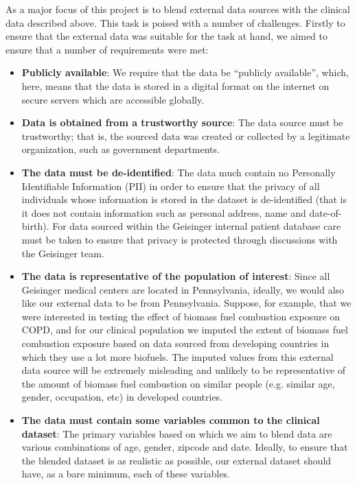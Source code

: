 \documentclass{article}
\begin{document}
As a major focus of this project is to blend external data sources with the clinical data described above. This task is poised with a number of challenges. Firstly to ensure that the external data was suitable for the task at hand, we aimed to ensure that a number of requirements were met:
\begin{itemize}
\item {\bf Publicly available}: We require that the data be ``publicly available'', which, here, means that the data is stored in a digital format on the internet on secure servers which are accessible globally. 
\item {\bf Data is obtained from a trustworthy source}: The data source must be trustworthy; that is, the sourced data was created or collected by a legitimate organization, such as government departments. 
\item {\bf The data must be de-identified}: The data much contain no Personally Identifiable Information (PII) in order to ensure that the privacy of all individuals whose information is stored in the dataset is de-identified (that is it does not contain information such as personal address, name and date-of-birth). For data sourced within the Geisinger internal patient database care must be taken to ensure that privacy is protected through discussions with the Geisinger team. 
\item {\bf The data is representative of the population of interest}: Since all Geisinger medical centers are located in Pennsylvania, ideally, we would also like our external data to be from Pennsylvania. Suppose, for example, that we were interested in testing the effect of biomass fuel combustion exposure on COPD, and for our clinical population we imputed the extent of biomass fuel combustion exposure based on data sourced from developing countries in which they use a lot more biofuels. The imputed values from this external data source will be extremely misleading and unlikely to be representative of the amount of biomass fuel combustion on similar people (e.g. similar age, gender, occupation, etc) in developed countries.
\item {\bf The data must contain some variables common to the clinical dataset}: The primary variables based on which we aim to blend data are various combinations of age, gender, zipcode and date. Ideally, to ensure that the blended dataset is as realistic as possible, our external dataset should have, as a bare minimum, each of these variables.
\end{itemize}
\end{document}
